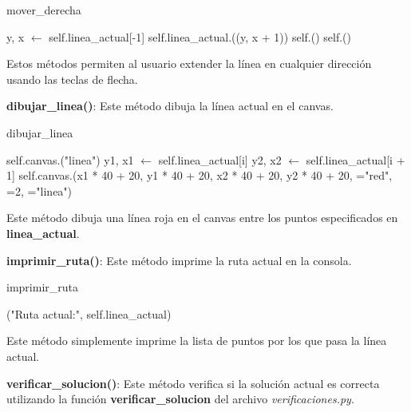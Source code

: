 \documentclass{article}
\begin{document}
\begin{algorithm}[H]
\caption{mover\_derecha}
\begin{algorithmic}[1]
        \State y, x $\leftarrow$ self.linea\_actual[-1]
            \State self.linea\_actual.((y, x + 1))
            \State self.()
            \State self.()
        \EndIf
    \EndIf
\EndProcedure
\end{algorithmic}
\end{algorithm}

Estos métodos permiten al usuario extender la línea en cualquier dirección usando las teclas de flecha.

\textbf{dibujar\_linea()}: Este método dibuja la línea actual en el canvas.

\begin{algorithm}[H]
\caption{dibujar\_linea}
\begin{algorithmic}[1]
    \State self.canvas.("linea")
        \State y1, x1 $\leftarrow$ self.linea\_actual[i]
        \State y2, x2 $\leftarrow$ self.linea\_actual[i + 1]
        \State self.canvas.(x1 * 40 + 20, y1 * 40 + 20, x2 * 40 + 20, y2 * 40 + 20, ="red", =2, ="linea")
    \EndFor
\EndProcedure
\end{algorithmic}
\end{algorithm}

Este método dibuja una línea roja en el canvas entre los puntos especificados en \textbf{linea\_actual}.

\textbf{imprimir\_ruta()}: Este método imprime la ruta actual en la consola.

\begin{algorithm}[H]
\caption{imprimir\_ruta}
\begin{algorithmic}[1]
    \State {}("Ruta actual:", self.linea\_actual)
\EndProcedure
\end{algorithmic}
\end{algorithm}

Este método simplemente imprime la lista de puntos por los que pasa la línea actual.

\textbf{verificar\_solucion()}: Este método verifica si la solución actual es correcta utilizando la función \textbf{verificar\_solucion} del archivo \textit{verificaciones.py}.
\end{document}
